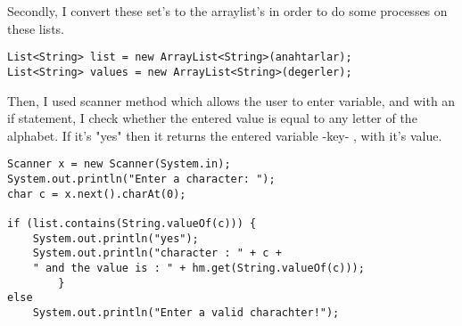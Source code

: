 \documentclass{report}
\begin{document}
\begin{flushleft}
Secondly, I convert these set's to the arraylist's in order to do some processes on these lists.
\end{flushleft}
\begin{lstlisting}
List<String> list = new ArrayList<String>(anahtarlar);
List<String> values = new ArrayList<String>(degerler);
\end{lstlisting}

\newpage
\begin{flushleft}
Then, I used scanner method which allows the user to enter variable, and with an if statement, I check whether the entered value is equal to any letter of the alphabet. If it's "yes" then it returns the entered variable -key- , with it's value.
\end{flushleft}
\begin{lstlisting}
Scanner x = new Scanner(System.in);
System.out.println("Enter a character: ");
char c = x.next().charAt(0);
		
if (list.contains(String.valueOf(c))) {
	System.out.println("yes");
	System.out.println("character : " + c +
	" and the value is : " + hm.get(String.valueOf(c)));
		}
else
	System.out.println("Enter a valid charachter!");
\end{lstlisting}
\end{document}

